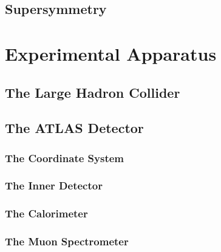 \documentclass[10pt,twoside,cucitura,classica,english,openany]{toptesi}
\begin{document}


\section{Supersymmetry}
\label{sec:supersymmetry}



\chapter{Experimental Apparatus}
\label{cha:exper-appar}

\section{The Large Hadron Collider}
\label{sec:large-hadr-coll}



\section{The ATLAS Detector}
\label{sec:atlas-detector}



\subsection{The Coordinate System}
\label{sec:coordinate-system}



\subsection{The Inner Detector}
\label{sec:inner-detector}



\subsection{The Calorimeter}
\label{sec:calorimeters}



\subsection{The Muon Spectrometer}
\label{sec:muon-spectrometer}


\end{document}
